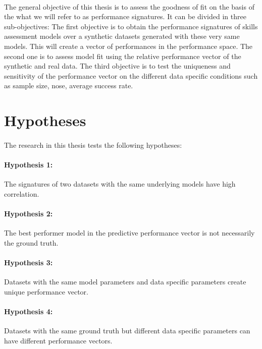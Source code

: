\paragraph{}The general objective of this thesis is to assess the goodness of fit on the basis of the what we will refer to as performance signatures. It can be divided in three sub-objectives: The first objective is to obtain the performance signatures of skills assessment models over a synthetic datasets generated with these very same models. This will create a vector of performances in the performance space. The second one is to assess model fit using the relative performance vector of the synthetic and real data. The third objective is to test the uniqueness and sensitivity of the performance vector on the different data specific conditions such as sample size, nose, average success rate.

\section{Hypotheses}
\paragraph{}The research in this thesis tests the following hypotheses:
\paragraph{Hypothesis 1:} The signatures of two datasets with the same underlying models have high correlation.
\paragraph{Hypothesis 2:} The best performer model in the predictive performance vector is not necessarily the ground truth.
\paragraph{Hypothesis 3:} Datasets with the same model parameters and data specific parameters create unique performance vector.  
\paragraph{Hypothesis 4:} Datasets with the same ground truth but different data specific parameters can have different performance vectors. 


